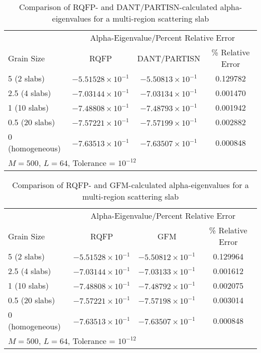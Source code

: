 \begin{table*}
\centering{}
\caption{Comparison of RQFP- and DANT/PARTISN-calculated alpha-eigenvalues for a multi-region scattering slab}
\label{AlphaDANT}
\begin{tabular}{@{}lccc@{}}\toprule
& \multicolumn{3}{c}{Alpha-Eigenvalue/Percent Relative Error} \\
\cmidrule{2-4} Grain Size & RQFP & DANT/PARTISN & \% Relative Error \\
\midrule
5 (2 slabs) & $-5.51528 \times 10^{-1}$ & $-5.50813 \times 10^{-1}$ & 0.129782 \\ 
2.5 (4 slabs) & $-7.03144 \times 10^{-1}$ & $-7.03134 \times 10^{-1}$ & 0.001470 \\ 
1 (10 slabs) & $-7.48808 \times 10^{-1}$ & $-7.48793 \times 10^{-1}$ & 0.001942 \\ 
0.5 (20 slabs) & $-7.57221 \times 10^{-1}$ & $-7.57199 \times 10^{-1}$ & 0.002882 \\ 
0 (homogeneous) & $-7.63513 \times 10^{-1}$ & $-7.63507 \times 10^{-1}$ & 0.000848 \\ 
\bottomrule
\multicolumn{4}{l}{$M = 500$, $L = 64$, Tolerance = $10^{-12}$} \\
\end{tabular}
\end{table*}

\begin{table*}
\centering{}
\caption{Comparison of RQFP- and GFM-calculated alpha-eigenvalues for a multi-region scattering slab}
\label{AlphaGFM}
\begin{tabular}{@{}lccc@{}}\toprule
& \multicolumn{3}{c}{Alpha-Eigenvalue/Percent Relative Error} \\
\cmidrule{2-4} Grain Size & RQFP & GFM & \% Relative Error \\
\midrule
5 (2 slabs) & $-5.51528 \times 10^{-1}$ & $-5.50812 \times 10^{-1}$ & 0.129964 \\ 
2.5 (4 slabs) & $-7.03144 \times 10^{-1}$ & $-7.03133 \times 10^{-1}$ & 0.001612 \\ 
1 (10 slabs) & $-7.48808 \times 10^{-1}$ & $-7.48792 \times 10^{-1}$ & 0.002075 \\ 
0.5 (20 slabs) & $-7.57221 \times 10^{-1}$ & $-7.57198 \times 10^{-1}$ & 0.003014 \\ 
0 (homogeneous) & $-7.63513 \times 10^{-1}$ & $-7.63507 \times 10^{-1}$ & 0.000848 \\ 
\bottomrule
\multicolumn{4}{l}{$M = 500$, $L = 64$, Tolerance = $10^{-12}$} \\
\end{tabular}
\end{table*}


